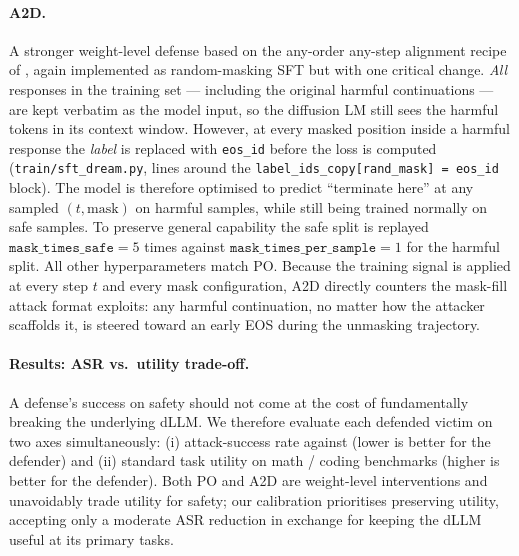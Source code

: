\paragraph{A2D.}
A stronger weight-level defense based on the any-order any-step alignment
recipe of \citet{a2d_anyorder}, again implemented as random-masking SFT
but with one critical change. \emph{All} responses in the training set
--- including the original harmful continuations --- are kept verbatim
as the model input, so the diffusion LM still sees the harmful tokens in
its context window. However, at every masked position inside a harmful
response the \emph{label} is replaced with \texttt{eos\_id} before the
loss is computed (\texttt{train/sft\_dream.py}, lines around the
\texttt{label\_ids\_copy[rand\_mask] = eos\_id} block). The model is
therefore optimised to predict ``terminate here'' at any sampled
$(t, \text{mask})$ on harmful samples, while still being trained
normally on safe samples. To preserve general capability the safe split
is replayed $\texttt{mask\_times\_safe}=5$ times against
$\texttt{mask\_times\_per\_sample}=1$ for the harmful split. All other
hyperparameters match PO. Because the training signal is applied at every
step $t$ and every mask configuration, A2D directly counters the mask-fill
attack format \method exploits: any harmful continuation, no matter how
the attacker scaffolds it, is steered toward an early EOS during the
unmasking trajectory.

\paragraph{Results: ASR vs.\ utility trade-off.}
A defense's success on safety should not come at the cost of fundamentally
breaking the underlying dLLM. We therefore evaluate each defended victim on
two axes simultaneously: (i) attack-success rate against \method (lower is
better for the defender) and (ii) standard task utility on math / coding
benchmarks (higher is better for the defender). Both PO and A2D are
weight-level interventions and unavoidably trade utility for safety; our
calibration prioritises preserving utility, accepting only a moderate ASR
reduction in exchange for keeping the dLLM useful at its primary tasks.

